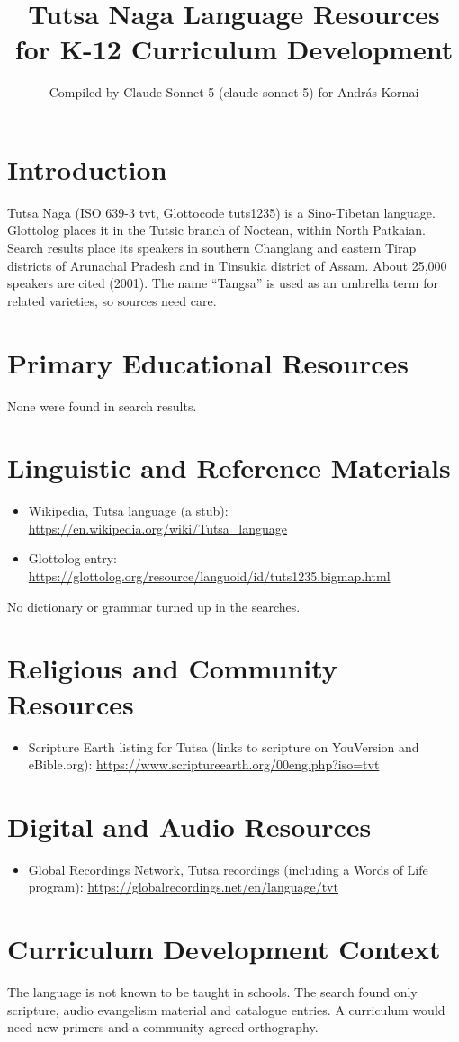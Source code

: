 \documentclass[12pt]{article}
\title{Tutsa Naga Language Resources for K-12 Curriculum Development}
\author{Compiled by Claude Sonnet 5 (claude-sonnet-5) for Andr\'as Kornai}
\date{}
\begin{document}
\maketitle

\section{Introduction}
Tutsa Naga (ISO 639-3 tvt, Glottocode tuts1235) is a Sino-Tibetan language. Glottolog places it in the Tutsic branch of Noctean, within North Patkaian. Search results place its speakers in southern Changlang and eastern Tirap districts of Arunachal Pradesh and in Tinsukia district of Assam. About 25,000 speakers are cited (2001). The name ``Tangsa'' is used as an umbrella term for related varieties, so sources need care.

\section{Primary Educational Resources}
None were found in search results.

\section{Linguistic and Reference Materials}
\begin{itemize}
\item Wikipedia, Tutsa language (a stub): \url{https://en.wikipedia.org/wiki/Tutsa_language}
\item Glottolog entry: \url{https://glottolog.org/resource/languoid/id/tuts1235.bigmap.html}
\end{itemize}
No dictionary or grammar turned up in the searches.

\section{Religious and Community Resources}
\begin{itemize}
\item Scripture Earth listing for Tutsa (links to scripture on YouVersion and eBible.org): \url{https://www.scriptureearth.org/00eng.php?iso=tvt}
\end{itemize}

\section{Digital and Audio Resources}
\begin{itemize}
\item Global Recordings Network, Tutsa recordings (including a Words of Life program): \url{https://globalrecordings.net/en/language/tvt}
\end{itemize}

\section{Curriculum Development Context}
The language is not known to be taught in schools. The search found only scripture, audio evangelism material and catalogue entries. A curriculum would need new primers and a community-agreed orthography.
\end{document}
